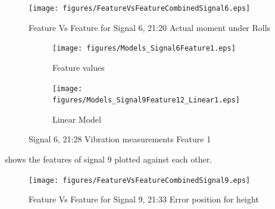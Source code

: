 \documentclass[]{article}
\begin{document}
\begin{figure}[H]
    \centering
    \texttt{[image: figures/FeatureVsFeatureCombinedSignal6.eps]}
    \caption{Feature Vs Feature for Signal 6, 21:20 Actual moment under Rolls}
    \label{fig:FeatureVsFeatureCombinedSignal6}
\end{figure}

\begin{figure}[H]
    \centering
		\begin{subfigure}{.5\textwidth}
		  \centering
    			\texttt{[image: figures/Models\_Signal6Feature1.eps]}
		  	\caption{Feature values}
		  	\label{fig:Models_Signal6Feature1}
		\end{subfigure}%
		\begin{subfigure}{.5\textwidth}
		  \centering
 		   	\texttt{[image: figures/Models\_Signal9Feature12\_Linear1.eps]}
		  	\caption{Linear Model}
		  	\label{fig:Models_Signal6Feature1_Linear1}
		\end{subfigure}
    \caption{Signal 6, 21:28 Vibration measurements Feature 1}
    \label{fig:Models_Signal6Feature1_Caption}
\end{figure}



 shows the features of signal 9 plotted against each other.
\begin{figure}[H]
    \centering
    \texttt{[image: figures/FeatureVsFeatureCombinedSignal9.eps]}
    \caption{Feature Vs Feature for Signal 9, 21:33 Error position for height}
    \label{fig:FeatureVsFeatureCombinedSignal9}
\end{figure}
\end{document}

